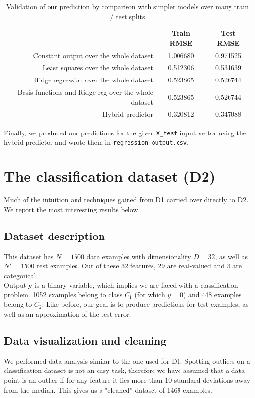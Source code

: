\documentclass{article} %
\begin{document}
  \begin{table}[h]
    \center
    \begin{tabular}{|r|c|c|}
      \hline
                                              & Train RMSE & Test RMSE \\
      \hline
      Constant output over the whole dataset  & 1.006680   & 0.971525 \\
      \hline
      Least squares over the whole dataset    & 0.512306   & 0.531639 \\
      \hline
      Ridge regression over the whole dataset & 0.523865   & 0.526744 \\
      \hline
      Basis functions and Ridge reg over the whole dataset & 0.523865   & 0.526744 \\
      \hline
      Hybrid predictor                        & 0.320812   & 0.347088 \\
      \hline
    \end{tabular}
    \caption{Validation of our prediction by comparison with simpler models over many train / test splits}
    \label{predictorValidation}
  \end{table}

  Finally, we produced our predictions for the given \texttt{X\_test} input vector using the hybrid predictor and wrote them in \texttt{regression-output.csv}.

\section{The classification dataset (D2)}
  Much of the intuition and techniques gained from D1 carried over directly to D2. We report the most interesting results below.

  \subsection{Dataset description}
  This dataset has $N = 1500$ data examples with dimensionality $D = 32$, as well as $N' = 1500$ test examples. Out of these 32 features, 29 are real-valued and 3 are categorical.\\
  Output $\mathbf{y}$ is a binary variable, which implies we are faced with a classification problem. 1052 examples belong to class $C_1$ (for which $y = 0$) and 448 examples belong to $C_2$. Like before, our goal is to produce predictions for test examples, as well as an approximation of the test error.

  \subsection{Data visualization and cleaning}
  We performed data analysis similar to the one used for D1. Spotting outliers on a classification dataset is not an easy task, therefore we have assumed that a data point is an outlier if for any feature it lies more than 10 standard deviations away from the median. This gives us a "cleaned'' dataset of 1469 examples.
\end{document}
